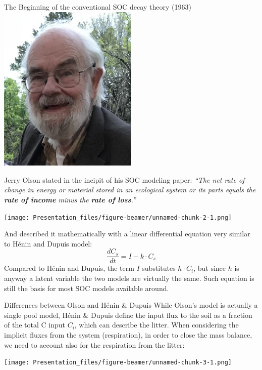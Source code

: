 \documentclass[
  ignorenonframetext,
]{beamer}
\begin{document}
\begin{frame}{The Beginning of the conventional SOC decay theory (1963)}
\protect\hypertarget{the-beginning-of-the-conventional-soc-decay-theory-1963}{}
\includegraphics[width=0.5\textwidth,height=\textheight]{Olson.jpg}

Jerry Olson stated in the incipit of his SOC modeling paper: \emph{``The
net rate of change in energy or material stored in an ecological system
or its parts equals the \textbf{rate of income} minus the \textbf{rate
of loss}.''}

\texttt{[image: Presentation\_files/figure-beamer/unnamed-chunk-2-1.png]}

And described it mathematically with a linear differential equation very
similar to Hénin and Dupuis model: \[
\frac{dC_s}{dt} = I - k \cdot C_s
\] Compared to Hénin and Dupuis, the term \(I\) substitutes
\(h \cdot C_i\), but since \(h\) is anyway a latent variable the two
models are virtually the same. Such equation is still the basis for most
SOC models available around.
\end{frame}

\begin{frame}{Differences between Olson and Hénin \& Dupuis}
\protect\hypertarget{differences-between-olson-and-huxe9nin-dupuis}{}
While Olson's model is actually a single pool model, Hénin \& Dupuis
define the input flux to the soil as a fraction of the total C input
\(C_i\), which can describe the litter. When considering the implicit
fluxes from the system (respiration), in order to close the mass
balance, we need to account also for the respiration from the litter:

\texttt{[image: Presentation\_files/figure-beamer/unnamed-chunk-3-1.png]}
\end{frame}
\end{document}
